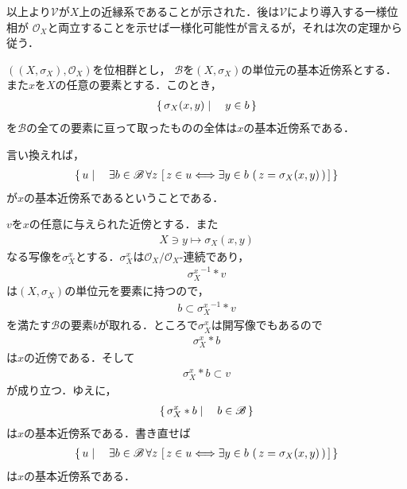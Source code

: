 	以上より$\mathscr{V}$が$X$上の近縁系であることが示された．後は$\mathscr{V}$により導入する一様位相が
	$\mathscr{O}_X$と両立することを示せば一様化可能性が言えるが，それは次の定理から従う．
	
	\begin{screen}
		\begin{thm}[位相群の位相は局所基で決まる]
		\label{thm:topologies_on_topological_groups_are_invariant}
			$\left(\left(X,\sigma_X\right),\mathscr{O}_X\right)$を位相群とし，
			$\mathscr{B}$を$\left(X,\sigma_X\right)$の単位元の基本近傍系とする．また$x$を$X$の任意の要素とする．このとき，
			\begin{align}
				\left\{\, \sigma_X(x,y) \mid \quad y \in b\, \right\}
			\end{align}
			を$\mathscr{B}$の全ての要素に亘って取ったものの全体は$x$の基本近傍系である．
		\end{thm}
	\end{screen}
	
	言い換えれば，
	\begin{align}
		\left\{\, u \mid \quad \exists b \in \mathscr{B}\, 
		\forall z\, \left[\, z \in u \Longleftrightarrow \exists y \in b\, \left(\, z=\sigma_X(x,y)\, \right) \, \right]\, \right\}
	\end{align}
	が$x$の基本近傍系であるということである．
	
	\begin{sketch}
		$v$を$x$の任意に与えられた近傍とする．また
		\begin{align}
			X \ni y \longmapsto \sigma_X(x,y)
		\end{align}
		なる写像を$\sigma_X^x$とする．$\sigma_X^x$は$\mathscr{O}_X/\mathscr{O}_X$-連続であり，
		\begin{align}
			{\sigma_X^x}^{-1} \ast v
		\end{align}
		は$\left(X,\sigma_X\right)$の単位元を要素に持つので，
		\begin{align}
			b \subset {\sigma_X^x}^{-1} \ast v
		\end{align}
		を満たす$\mathscr{B}$の要素$b$が取れる．ところで$\sigma_X^x$は開写像でもあるので
		\begin{align}
			\sigma_X^x \ast b
		\end{align}
		は$x$の近傍である．そして
		\begin{align}
			\sigma_X^x \ast b \subset v
		\end{align}
		が成り立つ．ゆえに，
		\begin{align}
			\left\{\, \sigma_X^x \ast b \mid \quad b \in \mathscr{B}\, \right\}
		\end{align}
		は$x$の基本近傍系である．書き直せば
		\begin{align}
			\left\{\, u \mid \quad \exists b \in \mathscr{B}\, 
			\forall z\, \left[\, z \in u \Longleftrightarrow \exists y \in b\, \left(\, z=\sigma_X(x,y)\, \right) \, \right]\, \right\}
		\end{align}
		は$x$の基本近傍系である．
		\QED
	\end{sketch}
	
